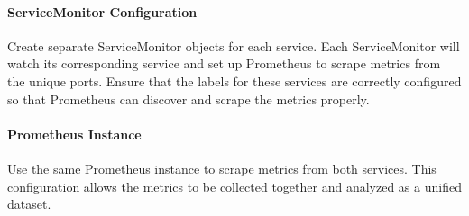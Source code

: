 \paragraph{ServiceMonitor Configuration}
Create separate ServiceMonitor objects for each service. Each ServiceMonitor will watch its corresponding service and set up Prometheus to scrape metrics from the unique ports. Ensure that the labels for these services are correctly configured so that Prometheus can discover and scrape the metrics properly.

\paragraph{Prometheus Instance}
Use the same Prometheus instance to scrape metrics from both services. This configuration allows the metrics to be collected together and analyzed as a unified dataset.
